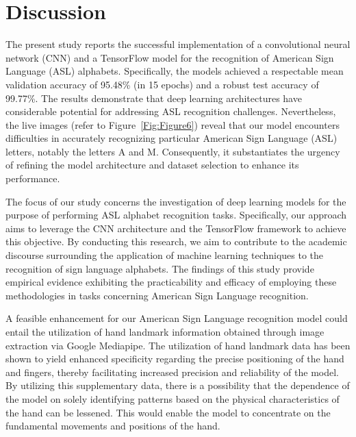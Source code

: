 \documentclass[conference]{IEEEtran}
\begin{document}
\section{Discussion}
The present study reports the successful implementation of a convolutional neural network (CNN) and a TensorFlow model for the recognition of American Sign Language (ASL) alphabets. Specifically, the models achieved a respectable mean validation accuracy of 95.48\% (in 15 epochs) and a robust test accuracy of 99.77\%. The results demonstrate that deep learning architectures have considerable potential for addressing ASL recognition challenges. Nevertheless, the live images (refer to Figure~\ref{Fig:Figure6}) reveal that our model encounters difficulties in accurately recognizing particular American Sign Language (ASL) letters, notably the letters A and M. Consequently, it substantiates the urgency of refining the model architecture and dataset selection to enhance its performance.

The focus of our study concerns the investigation of deep learning models for the purpose of performing ASL alphabet recognition tasks. Specifically, our approach aims to leverage the CNN architecture and the TensorFlow framework to achieve this objective. By conducting this research, we aim to contribute to the academic discourse surrounding the application of machine learning techniques to the recognition of sign language alphabets. The findings of this study provide empirical evidence exhibiting the practicability and efficacy of employing these methodologies in tasks concerning American Sign Language recognition.

A feasible enhancement for our American Sign Language recognition model could entail the utilization of hand landmark information obtained through image extraction via Google Mediapipe. The utilization of hand landmark data has been shown to yield enhanced specificity regarding the precise positioning of the hand and fingers, thereby facilitating increased precision and reliability of the model. By utilizing this supplementary data, there is a possibility that the dependence of the model on solely identifying patterns based on the physical characteristics of the hand can be lessened. This would enable the model to concentrate on the fundamental movements and positions of the hand.
\end{document}
